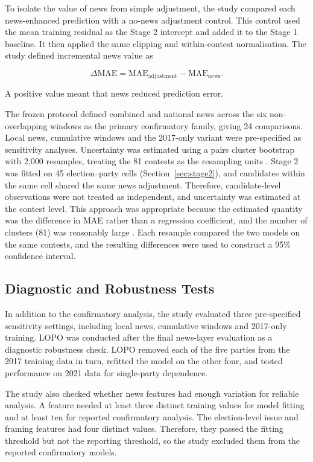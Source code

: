 \documentclass[final-report]{report-template}
\begin{document}
To isolate the value of news from simple adjustment, the study compared each news-enhanced prediction with a no-news adjustment control. This control used the mean training residual as the Stage 2 intercept and added it to the Stage 1 baseline. It then applied the same clipping and within-contest normalisation. The study defined incremental news value as

\[
\Delta \mathrm{MAE}
=
\mathrm{MAE}_{\text{adjustment}}
-
\mathrm{MAE}_{\text{news}}.
\]

A positive value meant that news reduced prediction error.

The frozen protocol defined combined and national news across the six non-overlapping windows as the primary confirmatory family, giving 24 comparisons. Local news, cumulative windows and the 2017-only variant were pre-specified as sensitivity analyses. Uncertainty was estimated using a pairs cluster bootstrap with 2,000 resamples, treating the 81 contests as the resampling units \parencite{MACKINNON2023272}. Stage 2 was fitted on 45 election--party cells (Section~\ref{sec:stage2}), and candidates within the same cell shared the same news adjustment. Therefore, candidate-level observations were not treated as independent, and uncertainty was estimated at the contest level. This approach was appropriate because the estimated quantity was the difference in MAE rather than a regression coefficient, and the number of clusters (81) was reasonably large \parencite{MACKINNON2023272}. Each resample compared the two models on the same contests, and the resulting differences were used to construct a 95\% confidence interval.

\subsection{Diagnostic and Robustness Tests}
\label{sec:diagnostic-robustness}
In addition to the confirmatory analysis, the study evaluated three pre-specified sensitivity settings, including local news, cumulative windows and 2017-only training. LOPO was conducted after the final news-layer evaluation as a diagnostic robustness check. LOPO removed each of the five parties from the 2017 training data in turn, refitted the model on the other four, and tested performance on 2021 data for single-party dependence.

The study also checked whether news features had enough variation for reliable analysis. A feature needed at least three distinct training values for model fitting and at least ten for reported confirmatory analysis. The election-level issue and framing features had four distinct values. Therefore, they passed the fitting threshold but not the reporting threshold, so the study excluded them from the reported confirmatory models.
\end{document}

